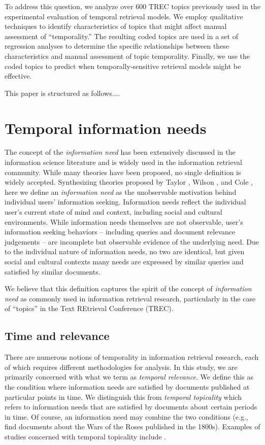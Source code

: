 \documentclass{sig-alternate}
\begin{document}
To address this question, we analyze over 600 TREC topics previously used in the experimental evaluation of temporal retrieval models. We employ qualitative techniques to identify characteristics of topics that might affect manual assessment of ``temporality.'' The resulting coded topics are used in a set of regression analyses to determine the specific relationships between these characteristics and manual assessment of topic temporality. Finally, we use the coded topics to predict when temporally-sensitive retrieval models might be effective.

This paper is structured as follows....

\section{Temporal information needs}

The concept of  the \emph{information need} has been extensively discussed in the information science literature and is widely used in the information retrieval community. While many theories have been proposed, no single definition is widely accepted. Synthesizing theories proposed by Taylor \cite{Taylor}, Wilson \cite{Wilson}, and Cole \cite{Cole}, here we define an \emph{information need} as the unobservable motivation behind individual users' information seeking. Information needs reflect the individual user's current state of mind and context, including social and cultural environments. While information needs themselves are not observable, user's information seeking behaviors -- including queries and document relevance judgements -- are incomplete but observable evidence of the underlying need. Due to the individual nature of information needs, no two are identical, but given social and cultural contexts many needs are expressed by similar queries and satisfied by similar documents. 

We believe that this definition captures the spirit of the concept of \emph{information need} as commonly used in information retrieval research, particularly in the case of ``topics'' in the Text REtrieval Conference (TREC).

\subsection{Time and relevance}

There are numerous notions of temporality in information retrieval research, each of which requires different methodologies for analysis. In this study, we are primarily concerned with what we term as \emph{temporal relevance}. We define this as the condition where information needs are satisfied by documents published at particular points in time. We distinguish this from \emph{temporal topicality} which refers to information needs that are satisfied by documents about certain periods in time. Of course, an information need may combine the two conditions (e.g., find documents about the Wars of the Roses published in the 1800s). Examples of studies concerned with temporal topicality include \cite{Berberich2010, Kanhabua2011}.
\end{document}
